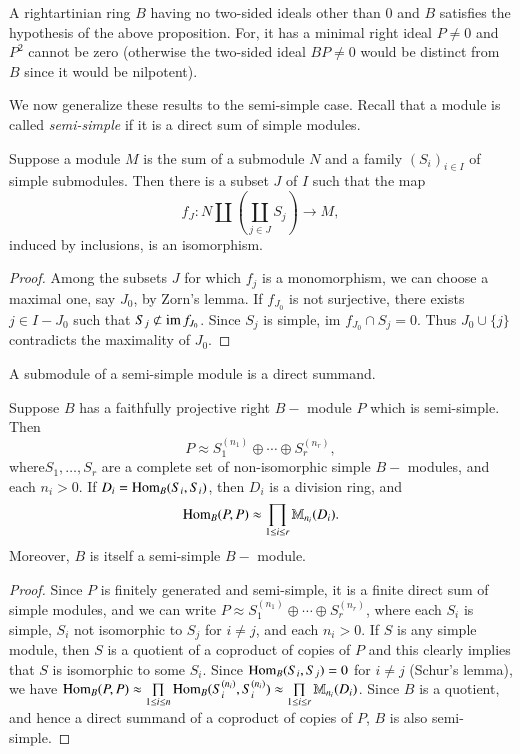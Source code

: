\begin{example*}%
A right\pageoriginale artinian ring $B$ having no two-sided ideals
other than $0$ 
and $B$ satisfies the hypothesis of the above proposition. For, it has
a minimal right ideal $P \neq 0$ and $P^2$ cannot be zero (otherwise
the two-sided ideal $BP \neq 0$ would be distinct from $B$ since it
would be nilpotent). 
\end{example*}

We now generalize these results to the semi-simple case. Recall that a
module is called \textit{semi-simple} if it is a direct sum of simple
modules. 

\setcounter{lemma}{3}
\begin{lemma} %
Suppose a module $M$ is the sum of a submodule $N$ and a family
$(S_i)_{i \in I}$ of simple submodules. Then there is a subset $J$ of
$I$ such that the map 
 $$
  f_J : N \coprod(  \coprod_{j \in J}S_j ) \rightarrow M, 
 $$
 induced by inclusions, is an isomorphism.
\end{lemma}

\begin{proof}
Among the subsets $J$ for which $f_j$ is a monomorphism, we can choose
a maximal one, say $J_0$, by Zorn's lemma. If $f_{J_0}$ is not
surjective, there exists $j \in I - J_0$ such that $S_j \not \subset
\operatorname{im} f_{J_0}$. Since $S_j$ is simple, im $f_{J_0} \cap S_j = 0$. Thus
$J_0 \cup \{ j \}$ contradicts the maximality of $J_0$. 
\end{proof}

\begin{coro*}%
A submodule of a semi-simple module is a direct summand.
\end{coro*}

\setcounter{prop}{4}
\begin{prop} %
 Suppose $B$ has a faithfully projective right $B-$ module $P$ which
 is semi-simple. Then 
 $$
 P \approx S^{(n_1)}_1 \oplus \cdots \oplus S^{(n_r)}_r, 
 $$
 where\pageoriginale $S_1, \ldots , S_r$ are a complete set of
 non-isomorphic simple 
 $B-$ modules, and each $n_i > 0$. If $D_i = \operatorname{Hom}_B(S_i, S_i)$, then
 $D_i$ is a division ring, and  
 $$
 \operatorname{Hom}_B (P, P) \approx \prod_{1 \leq i \leq r} \mathbb{M}_{n_i}
 (D_i). 
 $$
 Moreover, $B$ is itself a semi-simple $B-$ module. 
\end{prop}

\begin{proof}
Since $P$ is finitely generated and semi-simple, it is a finite direct
sum of simple modules, and we can write $P \approx S^{(n_1)}_1 \oplus
\cdots \oplus S^{(n_r)}_r$, where each $S_i$ is simple, $S_i$ not
isomorphic to $S_j$ for $i \neq j$, and each $n_i > 0$. If $S$ is any
simple module, then $S$ is a quotient of a coproduct of copies of $P$
and this clearly implies that $S$ is isomorphic to some $S_i$. Since
$\operatorname{Hom}_B (S_i, S_j) = 0$ for $i \neq j$ (Schur's lemma), we have $\operatorname{Hom}_B
(P, P) \approx \prod \limits_{1 \leq i \leq n} \operatorname{Hom}_B (S^{(n_i)}_i,
S^{(n_i)}_i) \approx \prod \limits_{1 \leq i \leq r} \mathbb{M}_{n_i}
(D_i)$. Since $B$ is a quotient, and hence a direct summand of a
coproduct of copies of $P$, $B$ is also semi-simple. 
\end{proof}



